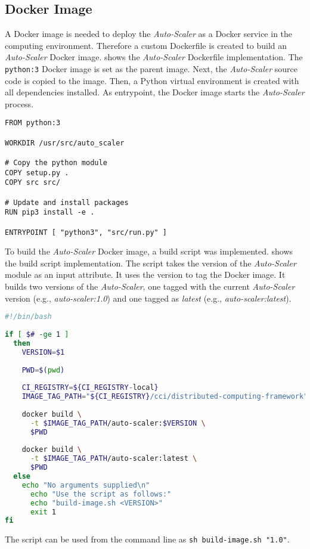 \subsection{Docker Image}
A Docker image is needed to deploy the \textit{Auto-Scaler} as a Docker service in the computing environment. Therefore a custom Dockerfile is created to build an \textit{Auto-Scaler} Docker image.
 shows the \textit{Auto-Scaler} Dockerfile implementation. The \texttt{python:3} Docker image is set as the parent image. 
Next, the \textit{Auto-Scaler} source code is copied to the image. Then, a Python virtual environment is created with all dependencies installed.
As entrypoint, the Docker image starts the \textit{Auto-Scaler} process.
\begin{lstlisting}[label=lst:06_auto-scaler_dockerfile, caption=Auto-Scaler Dockerfile]
FROM python:3
 
WORKDIR /usr/src/auto_scaler
 
# Copy the python module
COPY setup.py .
COPY src src/
 
# Update and install packages
RUN pip3 install -e .
 
ENTRYPOINT [ "python3", "src/run.py" ]
\end{lstlisting}


To build the \textit{Auto-Scaler} Docker image, a build script was implemented.  shows the build script implementation.
The script takes the version of the \textit{Auto-Scaler} module as an input attribute. It uses the version to tag the Docker image.
It builds two versions of the \textit{Auto-Scaler}, one tagged with the current \textit{Auto-Scaler} version (e.g., \textit{auto-scaler:1.0}) and one tagged as \textit{latest} (e.g., \textit{auto-scaler:latest}).
\newpage
\begin{lstlisting}[label=lst:06_auto-scaler_build, caption=Auto-Scaler build script, language=sh]
#!/bin/bash
 
if [ $# -ge 1 ]
  then
    VERSION=$1
 
    PWD=$(pwd)
 
    CI_REGISTRY=${CI_REGISTRY-local}
    IMAGE_TAG_PATH="${CI_REGISTRY}/cci/distributed-computing-framework"
 
    docker build \
      -t $IMAGE_TAG_PATH/auto-scaler:$VERSION \
      $PWD
 
    docker build \
      -t $IMAGE_TAG_PATH/auto-scaler:latest \
      $PWD
  else
    echo "No arguments supplied\n"
      echo "Use the script as follows:"
      echo "build-image.sh <VERSION>"
      exit 1
fi
\end{lstlisting}
The script can be used from the command line as \texttt{sh build-image.sh "1.0"}.


